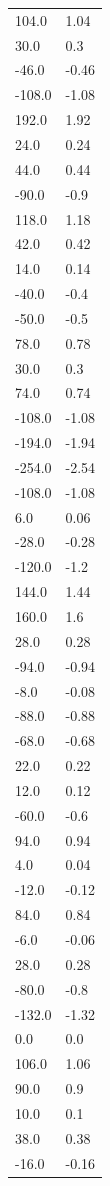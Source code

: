 \begin{longtable}{ll}
104.0 & 1.04 \\
30.0 & 0.3 \\
-46.0 & -0.46 \\
-108.0 & -1.08 \\
192.0 & 1.92 \\
24.0 & 0.24 \\
44.0 & 0.44 \\
-90.0 & -0.9 \\
118.0 & 1.18 \\
42.0 & 0.42 \\
14.0 & 0.14 \\
-40.0 & -0.4 \\
-50.0 & -0.5 \\
78.0 & 0.78 \\
30.0 & 0.3 \\
74.0 & 0.74 \\
-108.0 & -1.08 \\
-194.0 & -1.94 \\
-254.0 & -2.54 \\
-108.0 & -1.08 \\
6.0 & 0.06 \\
-28.0 & -0.28 \\
-120.0 & -1.2 \\
144.0 & 1.44 \\
160.0 & 1.6 \\
28.0 & 0.28 \\
-94.0 & -0.94 \\
-8.0 & -0.08 \\
-88.0 & -0.88 \\
-68.0 & -0.68 \\
22.0 & 0.22 \\
12.0 & 0.12 \\
-60.0 & -0.6 \\
94.0 & 0.94 \\
4.0 & 0.04 \\
-12.0 & -0.12 \\
84.0 & 0.84 \\
-6.0 & -0.06 \\
28.0 & 0.28 \\
-80.0 & -0.8 \\
-132.0 & -1.32 \\
0.0 & 0.0 \\
106.0 & 1.06 \\
90.0 & 0.9 \\
10.0 & 0.1 \\
38.0 & 0.38 \\
-16.0 & -0.16 \\

\end{longtable}
